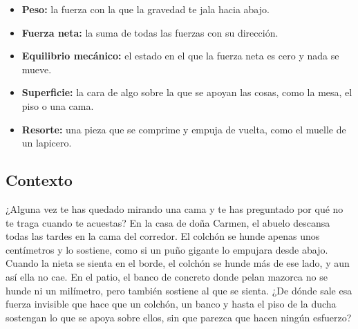 \documentclass[
  spanish,
  letterpaper,
  12pt,
  oneside,
  open=any,
  DIV=15]{scrbook}
\providecommand{\tightlist}{%
  \setlength{\itemsep}{0pt}\setlength{\parskip}{0pt}}
\begin{document}
\begin{tcolorbox}[enhanced jigsaw, arc=.35mm, bottomrule=.15mm, bottomtitle=1mm, breakable, colback=white, colbacktitle=quarto-callout-tip-color!10!white, colframe=quarto-callout-tip-color-frame, coltitle=black, left=2mm, leftrule=.75mm, opacityback=0, opacitybacktitle=0.6, rightrule=.15mm, title=\textcolor{quarto-callout-tip-color}{\faLightbulb}\hspace{0.5em}{Apoyo Procedimental (Vocabulario Clave)}, titlerule=0mm, toprule=.15mm, toptitle=1mm]

\begin{itemize}
\tightlist
\item
  \textbf{Peso:} la fuerza con la que la gravedad te jala hacia abajo.
\item
  \textbf{Fuerza neta:} la suma de todas las fuerzas con su dirección.
\item
  \textbf{Equilibrio mecánico:} el estado en el que la fuerza neta es
  cero y nada se mueve.
\item
  \textbf{Superficie:} la cara de algo sobre la que se apoyan las cosas,
  como la mesa, el piso o una cama.
\item
  \textbf{Resorte:} una pieza que se comprime y empuja de vuelta, como
  el muelle de un lapicero.
\end{itemize}

\end{tcolorbox}

\subsection{Contexto}\label{contexto-4}

¿Alguna vez te has quedado mirando una cama y te has preguntado por qué
no te traga cuando te acuestas? En la casa de doña Carmen, el abuelo
descansa todas las tardes en la cama del corredor. El colchón se hunde
apenas unos centímetros y lo sostiene, como si un puño gigante lo
empujara desde abajo. Cuando la nieta se sienta en el borde, el colchón
se hunde más de ese lado, y aun así ella no cae. En el patio, el banco
de concreto donde pelan mazorca no se hunde ni un milímetro, pero
también sostiene al que se sienta. ¿De dónde sale esa fuerza invisible
que hace que un colchón, un banco y hasta el piso de la ducha sostengan
lo que se apoya sobre ellos, sin que parezca que hacen ningún esfuerzo?
\end{document}
